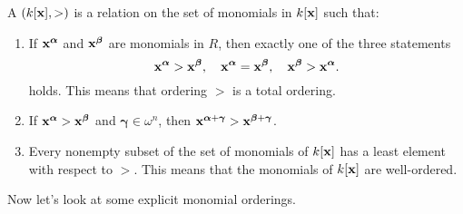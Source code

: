 \documentclass{ximera}
\begin{document}
\begin{definition}
  A  $(k[\mathbf{x}],>)$ is a relation on the set of
  monomials in $k[\mathbf{x}]$ such that:
  \begin{enumerate}
  \item If $\mathbf{x}^{\boldsymbol\alpha}$ and $\mathbf{x}^{\boldsymbol\beta}$ are
    monomials in $R$, then exactly one of the three statements
      \[
      \mathbf{x}^{\boldsymbol\alpha} > \mathbf{x}^{\boldsymbol\beta},\quad \mathbf{x}^{\boldsymbol\alpha} = \mathbf{x}^{\boldsymbol\beta},
      \quad \mathbf{x}^{\boldsymbol\beta} > \mathbf{x}^{\boldsymbol\alpha}.
      \]
      holds. This means that ordering $>$ is a total ordering.
    \item If $\mathbf{x}^{\boldsymbol\alpha}>\mathbf{x}^{\boldsymbol\beta}$ and
      $\boldsymbol\gamma\in\omega^n$, then
      $\mathbf{x}^{\boldsymbol\alpha+\boldsymbol\gamma}>\mathbf{x}^{\boldsymbol\beta+\boldsymbol\gamma}$.
    \item Every nonempty subset of the set of monomials of $k[\mathbf{x}]$ has
      a least element with respect to $>$. This means that the
      monomials of $k[\mathbf{x}]$ are well-ordered.
  \end{enumerate}
\end{definition}

Now let's look at some explicit monomial orderings.


\begin{definition}
\end{definition}


\begin{definition}
\end{definition}

\begin{definition}
\end{definition}

\begin{definition}
\end{definition}

\begin{definition}
\end{definition}
\end{document}
